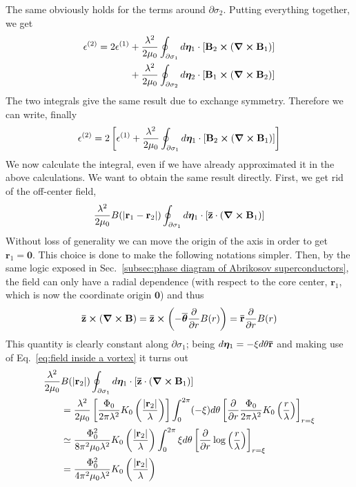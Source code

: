 The same obviously holds for the terms around $\partial\sigma_2$. Putting everything together, we get
\[
\begin{aligned}
	\epsilon^{(2)} = 2 \epsilon^{(1)} &+ \frac{\lambda^2}{2\mu_0} \oint_{\partial\sigma_1} d\bm\eta_1 \cdot \left[{ \mathbf{B}_2 \bm{\times} \left({\curl\mathbf{B}_1 }\right) }\right] \\
	&+ \frac{\lambda^2}{2\mu_0} \oint_{\partial\sigma_2} d\bm\eta_2 \cdot \left[{ \mathbf{B}_1 \bm{\times} \left({\curl\mathbf{B}_2 }\right) }\right]
\end{aligned}
\]
The two integrals give the same result due to exchange symmetry. Therefore we can write, finally
\[
	\epsilon^{(2)} = 2 \left[{ \epsilon^{(1)} + \frac{\lambda^2}{2\mu_0} \oint_{\partial\sigma_1} d\bm\eta_1 \cdot \left[{ \mathbf{B}_2 \bm{\times} \left({\curl\mathbf{B}_1 }\right) }\right] }\right]
\]
We now calculate the integral, even if we have already approximated it in the above calculations. We want to obtain the same result directly. First, we get rid of the off-center field,
\[
	\frac{\lambda^2}{2\mu_0} B(\abs{\mathbf{r}_1-\mathbf{r}_2}) \oint_{\partial\sigma_1} d\bm\eta_1 \cdot \left[{ \mathbf{\bar{z}}\cdot \left({\curl\mathbf{B}_1 }\right) }\right]
\]
Without loss of generality we can move the origin of the axis in order to get $\mathbf{r}_1 = \mathbf{0}$. This choice is done to make the following notations simpler. Then, by the same logic exposed in Sec.~\ref{subsec:phase diagram of Abrikosov superconductors}, the field can only have a radial dependence (with respect to the core center, $\mathbf{r}_1$, which is now the coordinate origin $\mathbf{0}$) and thus
\[
	\mathbf{\bar{z}} \bm{\times} \left({\curl\mathbf{B}}\right) = \mathbf{\bar{z}} \bm\times \left({-\overline{\bm\theta} \pdv{}{r} B(r)}\right) = \mathbf{\bar{r}} \pdv{}{r} B(r)
\]
This quantity is clearly constant along $\partial\sigma_1$; being $d\bm\eta_1 = -\xi d\theta \mathbf{\bar{r}}$ and making use of Eq.~\eqref{eq:field inside a vortex} it turns out
\[
\begin{aligned}
	\frac{\lambda^2}{2\mu_0} &B(\abs{\mathbf{r}_2}) \oint_{\partial\sigma_1} d\bm\eta_1 \cdot \left[{ \mathbf{\bar{z}}\cdot \left({\curl\mathbf{B}_1 }\right) }\right] \\
	&= \frac{\lambda^2}{2\mu_0} \left[{ \frac{\Phi_0}{2\pi\lambda^2} K_0 \left({\frac{\abs{\mathbf{r}_2}}{\lambda}}\right) }\right] \int_0^{2\pi} (-\xi) d\theta \left[{\pdv{}{r} \frac{\Phi_0}{2\pi\lambda^2} K_0 \left({\frac{r}{\lambda}}\right) }\right]_{r=\xi} \\
	&\simeq \frac{\Phi_0^2}{8\pi^2\mu_0 \lambda^2} K_0 \left({\frac{\abs{\mathbf{r}_2}}{\lambda}}\right) \int_0^{2\pi} \xi d\theta \left[{\pdv{}{r} \log\left({\frac{r}{\lambda}}\right) }\right]_{r=\xi} \\
	&= \frac{\Phi_0^2}{4\pi^2\mu_0 \lambda^2} K_0 \left({\frac{\abs{\mathbf{r}_2}}{\lambda}}\right)
\end{aligned}
\]
